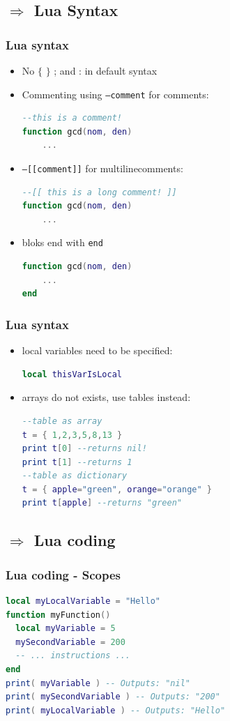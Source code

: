 \documentclass{beamer}
\begin{document}
\begin{frame}[fragile]
    \section{$ \Rightarrow $ Lua Syntax}
    \frametitle{Lua syntax}
    \begin{itemize}
        \item{No $\lbrace$ $\rbrace$ ; and : in default syntax}
        \item{Commenting using \texttt{--comment} for comments:}
            \begin{lstlisting}[language=lua]
--this is a comment!
function gcd(nom, den)
    ...
            \end{lstlisting}
        \item{\texttt{--[[comment]]} for multilinecomments:}
            \begin{lstlisting}[language=lua]
--[[ this is a long comment! ]]
function gcd(nom, den)
    ...
            \end{lstlisting}
        \item{bloks end with \texttt{end}}
        \begin{lstlisting}[language=lua]
function gcd(nom, den)
    ...
end
            \end{lstlisting}
\end{itemize}
\end{frame}

\begin{frame}[fragile]
    \frametitle{Lua syntax}
    \begin{itemize}
        \item{local variables need to be specified:}
            \begin{lstlisting}[language=lua]
local thisVarIsLocal
            \end{lstlisting}
        \item{arrays do not exists, use tables instead:}
            \begin{lstlisting}[language=lua]
--table as array
t = { 1,2,3,5,8,13 }
print t[0] --returns nil!
print t[1] --returns 1
--table as dictionary
t = { apple="green", orange="orange" }
print t[apple] --returns "green"
            \end{lstlisting}
\end{itemize}
\end{frame}

\begin{frame}[fragile]
    \section{$ \Rightarrow $ Lua coding}
    \frametitle{Lua coding - Scopes}
    \begin{lstlisting}[language=lua]
local myLocalVariable = "Hello"
function myFunction()
  local myVariable = 5
  mySecondVariable = 200
  -- ... instructions ...
end
print( myVariable ) -- Outputs: "nil"
print( mySecondVariable ) -- Outputs: "200"
print( myLocalVariable ) -- Outputs: "Hello"
    \end{lstlisting}
\end{frame}
\end{document}
